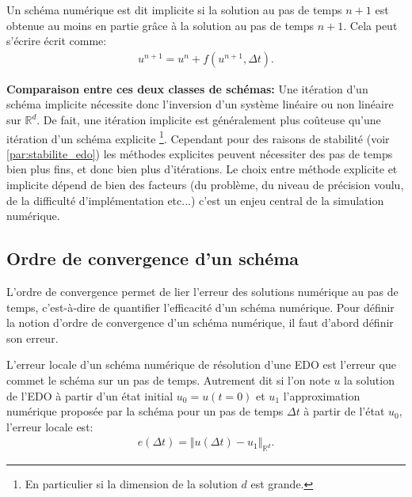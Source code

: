 \begin{definition}
    Un schéma numérique est dit implicite si la solution au pas de temps $n+1$ est obtenue au moins en partie grâce à la solution au pas de temps $n+1$. 
    Cela peut s'écrire écrit comme:
    \begin{align}
        u^{n+1} = u^n + f(u^{n+1} ,\Delta t ).
    \end{align}
    
\end{definition}

\textbf{Comparaison entre ces deux classes de schémas:}
Une itération d'un schéma implicite nécessite donc l'inversion d'un système linéaire ou non linéaire sur $\mathbb{R}^d$.
De fait, une itération implicite est généralement plus coûteuse qu'une itération d'un schéma explicite
\footnote{En particulier si la dimension de la solution $d$ est grande.}. 
Cependant pour des raisons de stabilité (voir \ref{par:stabilite_edo}) les méthodes explicites peuvent nécessiter des pas de temps bien plus fins, et donc bien plus d'itérations.
Le choix entre méthode explicite et implicite dépend de bien des facteurs (du problème, du niveau de précision voulu, de la difficulté d'implémentation etc...)
c'est un enjeu central de la simulation numérique.
\subsection{Ordre de convergence d'un schéma}
L'ordre de convergence permet de lier l'erreur des solutions numérique au pas de temps, c'est-à-dire de quantifier l'efficacité d'un schéma numérique.
Pour définir la notion d'ordre de convergence d'un schéma numérique, il faut d'abord définir son erreur.
\begin{definition}
    L'erreur locale d'un schéma numérique de résolution d'une EDO est l'erreur que commet le schéma sur un pas de temps.
    Autrement dit si l'on note $u$ la solution de l'EDO à partir d'un état initial $u_0 = u(t=0)$ et $u_1$ l'approximation numérique proposée par la schéma 
    pour un pas de temps $\Delta t$ à partir de l'état $u_0$, l'erreur locale est: 
    \begin{align}
        e(\Delta t) = \Vert u(\Delta t) - u_1 \Vert_{\mathbb{R}^d}.
    \end{align}
\end{definition}

